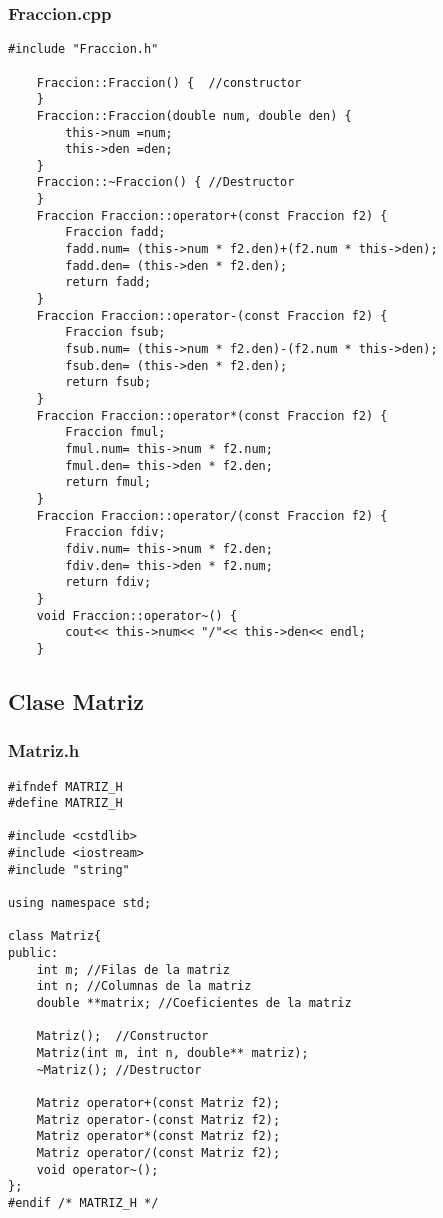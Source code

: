 \documentclass[11pt]{article}
\begin{document}
\subsubsection*{Fraccion.cpp}
\begin{lstlisting}
#include "Fraccion.h"

	Fraccion::Fraccion() {	//constructor	
	}
	Fraccion::Fraccion(double num, double den) {
		this->num =num;
		this->den =den;
	}
	Fraccion::~Fraccion() {	//Destructor
	}	
	Fraccion Fraccion::operator+(const Fraccion f2) {
		Fraccion fadd;
		fadd.num= (this->num * f2.den)+(f2.num * this->den);
		fadd.den= (this->den * f2.den);
		return fadd;
	}
	Fraccion Fraccion::operator-(const Fraccion f2) {	
		Fraccion fsub;
		fsub.num= (this->num * f2.den)-(f2.num * this->den);
		fsub.den= (this->den * f2.den);
		return fsub;
	}
	Fraccion Fraccion::operator*(const Fraccion f2) {	
		Fraccion fmul;
		fmul.num= this->num * f2.num;
		fmul.den= this->den * f2.den;
		return fmul;
	}
	Fraccion Fraccion::operator/(const Fraccion f2) {	
		Fraccion fdiv;
		fdiv.num= this->num * f2.den;
		fdiv.den= this->den * f2.num;
		return fdiv;
	}
	void Fraccion::operator~() {	
		cout<< this->num<< "/"<< this->den<< endl;
	}
\end{lstlisting}
\newpage
\subsection{Clase Matriz}
\subsubsection*{Matriz.h}
\begin{lstlisting}
#ifndef MATRIZ_H
#define MATRIZ_H

#include <cstdlib>
#include <iostream>
#include "string"

using namespace std;

class Matriz{
public:
	int m; //Filas de la matriz	
	int n; //Columnas de la matriz	
	double **matrix; //Coeficientes de la matriz
	
	Matriz();  //Constructor
	Matriz(int m, int n, double** matriz);
	~Matriz(); //Destructor
	
	Matriz operator+(const Matriz f2);
	Matriz operator-(const Matriz f2);
	Matriz operator*(const Matriz f2);
	Matriz operator/(const Matriz f2);
	void operator~();
};
#endif /* MATRIZ_H */
\end{lstlisting}
\vspace{1 em}
\end{document}
